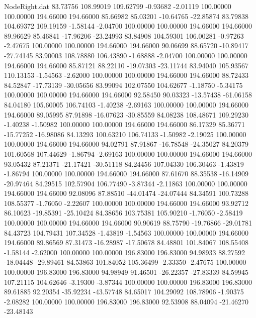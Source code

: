 \begin{filecontents}{NodeRight.dat}
  83.73756  108.99019  109.62799    -0.93682   -2.01119  100.00000  100.00000  194.66000  194.66000   85.66982   85.03201  -10.64765  -22.85874
  83.79838  104.69372  109.19159    -1.58144   -2.04700  100.00000  100.00000  194.66000  194.66000   89.96629   85.46841  -17.96206  -23.24993
  83.84908  104.59301  106.00281    -0.97263   -2.47675  100.00000  100.00000  194.66000  194.66000   90.06699   88.65720  -10.89417  -27.74145
  83.90003  108.78880  106.43890    -1.68888   -2.04700  100.00000  100.00000  194.66000  194.66000   85.87121   88.22110  -19.07303  -23.11744
  83.94040  105.93567  110.13153    -1.54563   -2.62000  100.00000  100.00000  194.66000  194.66000   88.72433   84.52847  -17.73139  -30.05656
  83.99094  102.07550  104.62677    -1.18750   -5.34175  100.00000  100.00000  194.66000  194.66000   92.58450   90.03323  -13.57438  -61.06158
  84.04180  105.60005  106.74103    -1.40238   -2.69163  100.00000  100.00000  194.66000  194.66000   89.05995   87.91898  -16.07623  -30.85559
  84.08238  108.48671  109.29230    -1.40238   -1.50982  100.00000  100.00000  194.66000  194.66000   86.17329   85.36771  -15.77252  -16.98086
  84.13293  100.63210  106.74133    -1.50982   -2.19025  100.00000  100.00000  194.66000  194.66000   94.02791   87.91867  -16.78548  -24.35027
  84.20379  101.60568  107.44629    -1.86794   -2.69163  100.00000  100.00000  194.66000  194.66000   93.05432   87.21371  -21.17421  -30.51118
  84.24456  107.04330  106.30463    -1.43819   -1.86794  100.00000  100.00000  194.66000  194.66000   87.61670   88.35538  -16.14909  -20.97464
  84.29515  102.57904  106.77490    -3.87344   -2.11863  100.00000  100.00000  194.66000  194.66000   92.08096   87.88510  -44.01474  -24.07444
  84.34591  100.73288  108.55377    -1.76050   -2.22607  100.00000  100.00000  194.66000  194.66000   93.92712   86.10623  -19.85391  -25.10424
  84.38656  103.75381  105.90210    -1.76050   -2.58419  100.00000  100.00000  194.66000  194.66000   90.90619   88.75790  -19.76866  -29.01781
  84.43723  104.79431  107.34528    -1.43819   -1.54563  100.00000  100.00000  194.66000  194.66000   89.86569   87.31473  -16.28987  -17.50678
  84.48801  101.84067  108.55408    -1.58144   -2.62000  100.00000  100.00000  196.83000  196.83000   94.98933   88.27592  -18.04448  -29.89461
  84.53863  101.84052  105.36499    -2.33350   -2.47675  100.00000  100.00000  196.83000  196.83000   94.98949   91.46501  -26.22357  -27.83339
  84.59945  107.21115  104.62646    -3.19300   -3.87344  100.00000  100.00000  196.83000  196.83000   89.61885   92.20354  -35.92234  -43.57748
  84.65017  104.29092  108.78906    -1.90375   -2.08282  100.00000  100.00000  196.83000  196.83000   92.53908   88.04094  -21.46270  -23.48143

\end{filecontents}
